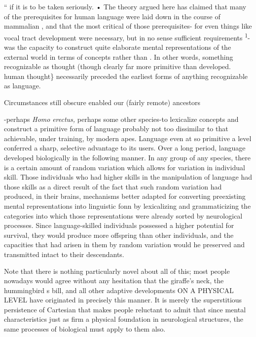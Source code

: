 `` if it is to be taken seriously. • The theory argued here has claimed that many of the prerequisites for human language were laid down in the course of mammalian , and that the most critical of those prerequisites- for even things like vocal tract development were necessary, but in no sense
sufficient requirements \textsuperscript{1}{}-was the capacity to construct quite elaborate
mental representations of the external world in terms of concepts rather than . In other words, something recognizable as thought (though clearly far more primitive than developed. human thought\} necessarily preceded the earliest forms of anything recognizable as language.

Circumstances still obscure enabled our (fairly remote) ancestors

{}-perhaps \textit{Homo} \textit{erectus,} perhaps some other species{}-to lexicalize concepts and construct a primitive form of language probably not too dissimilar to that achievable, under training, by modern apes. Language even at so primitive a level conferred a sharp, selective advantage to its users. Over a long period, language developed biologically in the follow\-ing manner. In any group of any species, there is a certain amount of random variation which allows for variation in individual skill. Those individuals who had higher skills in the manipulation of language had those skills as a direct result of the fact that such random variation had produced, in their brains, mechanisms better adapted for converting preexisting mental representations into linguistic fonn by lexicalizing and grammaticizing the categories into which those representations were already sorted by neurological processes. Since language-skilled individuals possessed a higher potential for survival, they would pro\-duce more offspring than other individuals, and the capacities that had arisen in them by random variation would he preserved and trans\-mitted intact to their descendants.

Note that there is nothing particularly novel about all of this; most people nowadays would agree without any hesitation that the giraffe's neck, the hummingbird s bill, and all other adaptive develop\-ments ON A PHYSICAL LEVEL have originated in precisely this manner. It is merely the superstitious persistence of Cartesian  that makes people reluctant to admit that since mental characteristics just as firm a physical foundation in neurological structures,
the same processes of biological  must apply to them also.

